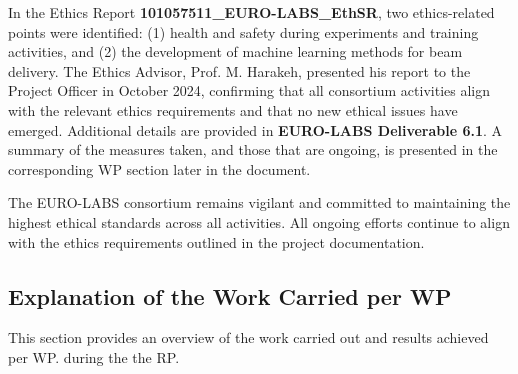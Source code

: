 

In the Ethics Report \textbf{101057511\_EURO-LABS\_EthSR}, two ethics-related points were identified: (1) health and safety during experiments and training activities, and (2) the development of machine learning methods for beam delivery. The Ethics Advisor, Prof. M. Harakeh, presented his report to the Project Officer in October 2024, confirming that all consortium activities align with the relevant ethics requirements and that no new ethical issues have emerged. Additional details are provided in \textbf{EURO-LABS Deliverable 6.1}. A summary of the measures taken, and those that are ongoing, is presented in the corresponding WP section later in the document. 

The EURO-LABS consortium remains vigilant and committed to maintaining the highest ethical standards across all activities. All ongoing efforts continue to align with the ethics requirements outlined in the project documentation.


\subsection{Explanation of the Work Carried per WP}

This section provides an overview of the work carried out and results achieved per WP. 
during the the  \acrshort{RP}.   







% 










